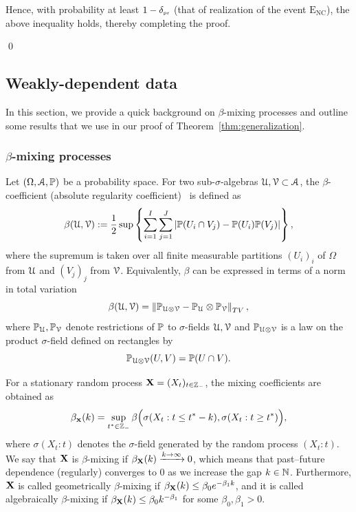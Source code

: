 Hence, with probability at least $1-\delta_{\scriptscriptstyle \operatorname{pr}}$ (that of realization of the event $\mathrm{E_{NC}}$), the above inequality holds, thereby completing the proof.

\qed


\subsection{Weakly-dependent data}\label{subsec:weakly-dependent-data}
In this section, we provide a quick background on $\beta$-mixing processes and outline some results that we use in our proof of Theorem~\ref{thm:generalization}. 

\subsubsection{\texorpdfstring{$\beta$-}{β-}mixing processes}
Let $(\Omega, {\mathcal{A}}, {\mathbb{P}})$ be a probability space. For two sub-$\sigma$-algebras ${\mathcal{U}}, {\mathcal{V}} \subset {\mathcal{A}}$, the $\beta$-coefficient (absolute regularity coefficient)~\cite{Volkonskii_Rozanov_Yu_1959} is defined as 
\begin{equation}\label{eq:def-beta-mixing}
    \beta({\mathcal{U}}, {\mathcal{V}}) := \frac{1}{2} \sup\left\{\sum_{i=1}^I \sum_{j=1}^J \left| {\mathbb{P}}(U_i \cap V_j) - {\mathbb{P}}(U_i){\mathbb{P}}(V_j) \right|\right\},
\end{equation}
where the supremum is taken over all finite measurable partitions $(U_i)_i$ of $\Omega$ from ${\mathcal{U}}$ and $(V_j)_j$ from ${\mathcal{V}}$. Equivalently, $\beta$ can be expressed in terms of a norm in total variation~\citep{dedecker2007} 
$$
\beta({\mathcal{U}}, {\mathcal{V}}) = \left\lVert{\mathbb{P}}_{{\mathcal{U}} \otimes {\mathcal{V}}} - {\mathbb{P}}_{{\mathcal{U}}} \otimes {\mathbb{P}}_{{\mathcal{V}}}\right\rVert_{TV},
$$ 
where ${\mathbb{P}}_{{\mathcal{U}}}, {\mathbb{P}}_{{\mathcal{V}}}$ denote restrictions of ${\mathbb{P}}$ to $\sigma$-fields ${\mathcal{U}}, {\mathcal{V}}$ and ${\mathbb{P}}_{{\mathcal{U}} \otimes {\mathcal{V}}}$ is a law on the product $\sigma$-field defined on rectangles by $${\mathbb{P}}_{{\mathcal{U}} \otimes {\mathcal{V}}}(U,V) = {\mathbb{P}}(U \cap V).$$

For a stationary random process ${\mathbf{X}} = (X_t)_{t \in {\mathbb{Z}}_-}$, the mixing coefficients are obtained as
\begin{equation*}
    \beta_{\scriptscriptstyle {\mathbf{X}}}(k) = \sup_{t^\ast \in {\mathbb{Z}}_-} \beta\Big(\sigma(X_t : t \leq t^\ast - k), \sigma(X_t : t \geq t^\ast) \Big),
\end{equation*}
where $\sigma(X_t : t)$ denotes the $\sigma$-field generated by the random process $(X_t : t)$. We say that ${\mathbf{X}}$ is $\beta$-mixing if $\beta_{{\mathbf{X}}}(k) \xrightarrow{k \to \infty} 0$, which means that past--future dependence (regularly) converges to $0$ as we increase the gap $k \in {\mathbb{N}}$. Furthermore, ${\mathbf{X}}$ is called geometrically $\beta$-mixing if $\beta_{{\mathbf{X}}}(k) \leq \beta_0 e^{-\beta_1 k}$, and it is called algebraically $\beta$-mixing if $\beta_{{\mathbf{X}}}(k) \leq \beta_0 k^{-\beta_1}$ for some $\beta_0, \beta_1 > 0$.


